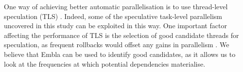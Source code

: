 One way of achieving better automatic parallelisation is to use
thread-level speculation (TLS) \cite{Rundberg01anall-software,
gregory05stampede, welc05safe}.  Indeed, some of the speculative
task-level parallelism uncovered in this study can be exploited in
this way.  One important factor affecting the performance of TLS is
the selection of good candidate threads for speculation, as frequent
rollbacks would offset any gains in parallelism \cite{johnson04mincut,
liu06posh}.  We believe that Embla can be used to identify good
candidates, as it allows us to look at the frequencies at which
potential dependencies materialise.
